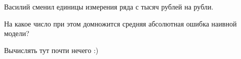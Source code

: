 
\begin{question}
Василий сменил единицы измерения ряда с тысяч рублей на рубли.

На какое число при этом домножится средняя абсолютная ошибка наивной модели?
\end{question}

\begin{solution}
Вычислять тут почти нечего :)
\end{solution}

